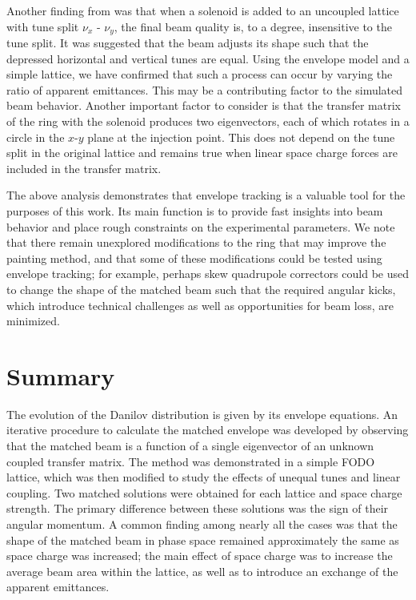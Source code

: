 Another finding from \cite{Holmes2018} was that when a solenoid is added to an uncoupled lattice with tune split $\nu_x$ - $\nu_y$, the final beam quality is, to a degree, insensitive to the tune split. It was suggested that the beam adjusts its shape such that the depressed horizontal and vertical tunes are equal. Using the envelope model and a simple lattice, we have confirmed that such a process can occur by varying the ratio of apparent emittances. This may be a contributing factor to the simulated beam behavior. Another important factor to consider is that the transfer matrix of the ring with the solenoid produces two eigenvectors, each of which rotates in a circle in the $x$-$y$ plane at the injection point. This does not depend on the tune split in the original lattice and remains true when linear space charge forces are included in the transfer matrix.

The above analysis demonstrates that envelope tracking is a valuable tool for the purposes of this work. Its main function is to provide fast insights into beam behavior and place rough constraints on the experimental parameters. We note that there remain unexplored modifications to the ring that may improve the painting method, and that some of these modifications could be tested using envelope tracking; for example, perhaps skew quadrupole correctors could be used to change the shape of the matched beam such that the required angular kicks, which introduce technical challenges as well as opportunities for beam loss, are minimized. 


\section{Summary}

The evolution of the Danilov distribution is given by its envelope equations. An iterative procedure to calculate the matched envelope was developed by observing that the matched beam is a function of a single eigenvector of an unknown coupled transfer matrix. The method was demonstrated in a simple FODO lattice, which was then modified to study the effects of unequal tunes and linear coupling. Two matched solutions were obtained for each lattice and space charge strength. The primary difference between these solutions was the sign of their angular momentum. A common finding among nearly all the cases was that the shape of the matched beam in phase space remained approximately the same as space charge was increased; the main effect of space charge was to increase the average beam area within the lattice, as well as to introduce an exchange of the apparent emittances.

